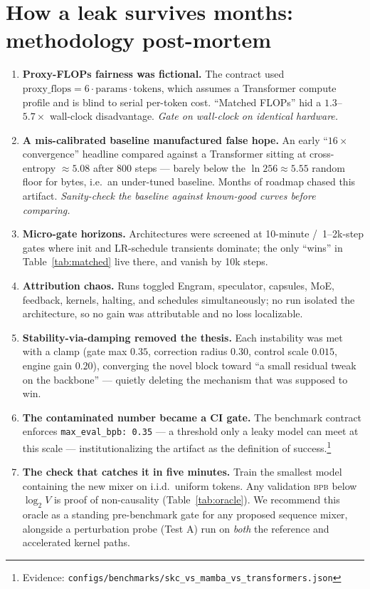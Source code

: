 \documentclass[11pt]{article}
\newcommand{\bpb}{\textsc{bpb}}
\newcommand{\evid}[1]{\footnote{Evidence: \texttt{#1}}}
\begin{document}
\section{How a leak survives months: methodology post-mortem}
\label{sec:method}
\begin{enumerate}
  \item \textbf{Proxy-FLOPs fairness was fictional.} The contract used
  $\mathrm{proxy\_flops} = 6 \cdot \mathrm{params} \cdot \mathrm{tokens}$,
  which assumes a Transformer compute profile and is blind to serial per-token
  cost. ``Matched FLOPs'' hid a $1.3$--$5.7\times$ wall-clock disadvantage.
  \emph{Gate on wall-clock on identical hardware.}
  \item \textbf{A mis-calibrated baseline manufactured false hope.} An early
  ``$16\times$ convergence'' headline compared against a Transformer sitting at
  cross-entropy $\approx 5.08$ after 800 steps --- barely below the
  $\ln 256 \approx 5.55$ random floor for bytes, i.e.\ an under-tuned baseline.
  Months of roadmap chased this artifact. \emph{Sanity-check the baseline
  against known-good curves before comparing.}
  \item \textbf{Micro-gate horizons.} Architectures were screened at 10-minute
  /\ 1--2k-step gates where init and LR-schedule transients dominate; the only
  ``wins'' in Table~\ref{tab:matched} live there, and vanish by 10k steps.
  \item \textbf{Attribution chaos.} Runs toggled Engram, speculator, capsules,
  MoE, feedback, kernels, halting, and schedules simultaneously; no run
  isolated the architecture, so no gain was attributable and no loss
  localizable.
  \item \textbf{Stability-via-damping removed the thesis.} Each instability
  was met with a clamp (gate max $0.35$, correction radius $0.30$, control
  scale $0.015$, engine gain $0.20$), converging the novel block toward ``a
  small residual tweak on the backbone'' --- quietly deleting the mechanism
  that was supposed to win.
  \item \textbf{The contaminated number became a CI gate.} The benchmark
  contract enforces \texttt{max\_eval\_bpb: 0.35} --- a threshold only a leaky
  model can meet at this scale --- institutionalizing the artifact as the
  definition of success.\evid{configs/benchmarks/skc\_vs\_mamba\_vs\_transformers.json}
  \item \textbf{The check that catches it in five minutes.} Train the smallest
  model containing the new mixer on i.i.d.\ uniform tokens. Any validation
  \bpb{} below $\log_2 V$ is proof of non-causality (Table~\ref{tab:oracle}).
  We recommend this oracle as a standing pre-benchmark gate for any proposed
  sequence mixer, alongside a perturbation probe (Test A) run on \emph{both}
  the reference and accelerated kernel paths.
\end{enumerate}
\end{document}
